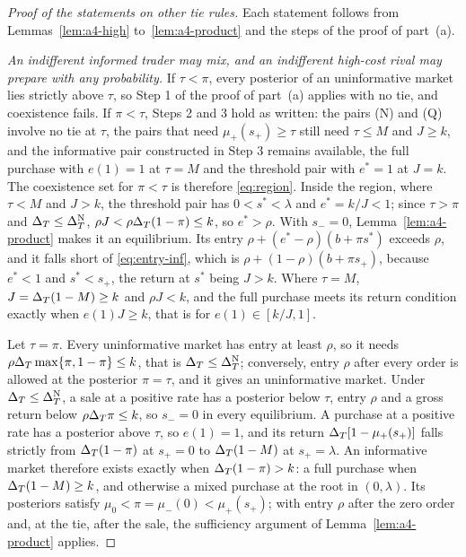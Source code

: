 \begin{proof}[Proof of the statements on other tie rules]
Each statement follows from Lemmas~\ref{lem:a4-high} to~\ref{lem:a4-product} and the steps of the proof of part~(a).

\emph{An indifferent informed trader may mix, and an indifferent high-cost rival may prepare with any probability.} If
\(\tau<\pi\), every posterior of an uninformative market lies strictly above \(\tau\), so Step 1 of the proof of part~(a)
applies with no tie, and coexistence fails. If \(\pi<\tau\), Steps 2 and 3 hold as written: the pairs (N) and (Q)
involve no tie at \(\tau\), the pairs that need \(\mu_+(s_+)\ge\tau\) still need \(\tau\le M\) and \(J\ge k\), and the
informative pair constructed in Step 3 remains available, the full purchase with \(e(1)=1\) at \(\tau=M\) and the
threshold pair with \(e^*=1\) at \(J=k\). The coexistence set for \(\pi<\tau\) is therefore \eqref{eq:region}. Inside
the region, where \(\tau<M\) and \(J>k\), the threshold pair has \(0<s^*<\lambda\) and \(e^*=k/J<1\); since \(\tau>\pi\)
and \(\Delta_T\le\Delta_T^{\rm N}\), \(\rho J<\rho\Delta_T(1-\pi)\le k\), so \(e^*>\rho\). With \(s_-=0\), Lemma~\ref{lem:a4-product}
makes it an equilibrium. Its entry \(\rho+(e^*-\rho)(b+\pi s^*)\) exceeds \(\rho\), and it falls short of
\eqref{eq:entry-inf}, which is \(\rho+(1-\rho)(b+\pi s_+)\), because \(e^*<1\) and \(s^*<s_+\), the return at \(s^*\)
being \(J>k\). Where \(\tau=M\), \(J=\Delta_T(1-M)\ge k\) and \(\rho J<k\), and the full purchase meets its return condition
exactly when \(e(1)J\ge k\), that is for \(e(1)\in[k/J,1]\).

Let \(\tau=\pi\). Every uninformative market has entry at least \(\rho\), so it needs \(\rho\Delta_T\max\{\pi,1-\pi\}\le k\), that is
\(\Delta_T\le\Delta_T^{\rm N}\); conversely, entry \(\rho\) after every order is allowed at the posterior \(\pi=\tau\), and it gives
an uninformative market. Under \(\Delta_T\le\Delta_T^{\rm N}\), a sale at a positive rate has a posterior below \(\tau\), entry \(\rho\) and
a gross return below \(\rho\Delta_T\pi\le k\), so \(s_-=0\) in every equilibrium. A purchase at a positive rate has a
posterior above \(\tau\), so \(e(1)=1\), and its return \(\Delta_T[1-\mu_+(s_+)]\) falls strictly from \(\Delta_T(1-\pi)\) at
\(s_+=0\) to \(\Delta_T(1-M)\) at \(s_+=\lambda\). An informative market therefore exists exactly when \(\Delta_T(1-\pi)>k\): a
full purchase when \(\Delta_T(1-M)\ge k\), and otherwise a mixed purchase at the root in \((0,\lambda)\). Its posteriors
satisfy \(\mu_0<\pi=\mu_-(0)<\mu_+(s_+)\); with entry \(\rho\) after the zero order and, at the tie, after the sale, the
sufficiency argument of Lemma~\ref{lem:a4-product} applies.


\end{proof}
